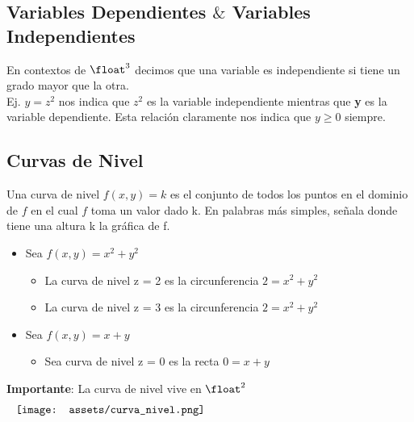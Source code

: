 \documentclass[10pt,a4paper]{article}
\begin{document}
\subsection*{Variables Dependientes $\&$ Variables Independientes}
En contextos de $\float^{3}$ decimos que una variable es independiente si tiene un grado mayor que la otra. \\
Ej. $y = z^{2}$ nos indica que $z^{2}$ es la variable independiente mientras que \textbf{y} es la variable dependiente. Esta relación claramente nos indica que $y \ge 0 $ siempre.
\subsection*{Curvas de Nivel}
Una curva de nivel $f(x,y) = k$ es el conjunto de todos los puntos en el dominio de $f$ en el cual $f$ toma un valor dado k. En palabras más simples, señala donde tiene una altura k la gráfica de f. 
\begin{itemize}
    \item Sea $f(x,y) = x^{2}+y^{2}$
    \begin{itemize}
        \item La curva de nivel z = 2 es la circunferencia $2 = x^{2} + y^{2}$
        \item La curva de nivel z = 3 es la circunferencia $2 = x^{2} + y^{2}$
    \end{itemize}
    \item Sea $f(x,y) = x+y$
    \begin{itemize}
        \item Sea curva de nivel z = 0 es la recta $0 = x + y$
    \end{itemize}
\end{itemize}
\textbf{Importante}: La curva de nivel vive en $\float^{2}$
\[\begin{minipage}[b]{1\textwidth}
    \texttt{[image: assets/curva\_nivel.png]}
\end{minipage}\]
\end{document}
